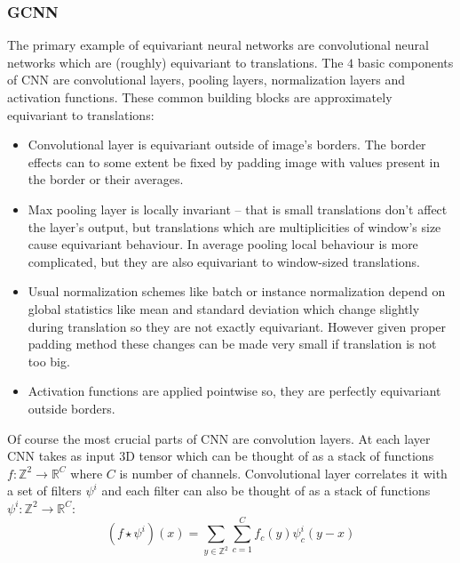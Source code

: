     \subsubsection{GCNN}
    The primary example of equivariant neural networks are convolutional neural
    networks which are (roughly) equivariant to translations. The $4$ basic
    components of CNN are convolutional layers, pooling layers, normalization
    layers and activation functions.  These common building blocks are approximately
    equivariant to translations:
    \begin{itemize}
        \item Convolutional layer is
            equivariant outside of image's borders. The border effects can to
            some extent be fixed by padding image with values present in the
            border or their averages.
        \item Max pooling layer is locally invariant -- that is small translations don't
            affect the layer's output, but translations which are multiplicities
            of window's size cause equivariant behaviour.
            In average pooling local behaviour is more
            complicated, but they are also equivariant to window-sized
            translations.
        \item Usual normalization schemes like batch or instance
            normalization depend on global statistics
            like mean and standard deviation which change slightly during
            translation so they are not exactly equivariant. However given
            proper padding method these changes can be made very small if
            translation is not too big.
        \item Activation functions are applied pointwise so, they are
            perfectly equivariant outside borders.
    \end{itemize}
    Of course the most crucial parts of CNN are convolution layers. At each
    layer CNN takes as input 3D tensor which can be thought of as a
    stack of functions $f:\mathbb{Z}^2\to\mathbb{R}^C$ where $C$ is number of channels.
    Convolutional layer correlates it with a set of filters $\psi^i$
    and each filter can also be thought of as a stack of functions
    $\psi^i:\mathbb{Z}^2\to\mathbb{R}^C$:
    \begin{equation}
        \label{eq:cnn}
        (f\star\psi^i)(x) = \sum_{y\in\mathbb{Z}^2}\sum_{c=1}^C
        f_c(y)\psi_{c}^{i}(y-x)
    \end{equation}

